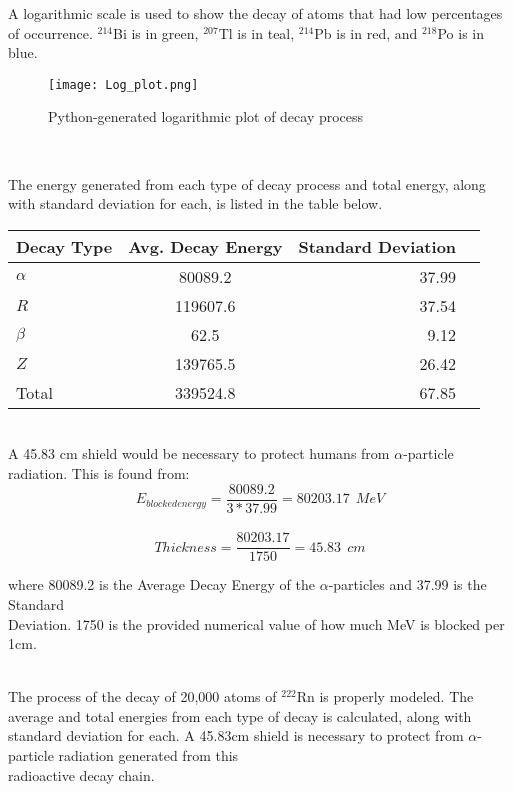 \documentclass[12pt]{article}
\begin{document}
\indent A logarithmic scale is used to show the decay of atoms that had low percentages of occurrence. \indent $^{214}$Bi is in green, $^{207}$Tl is in teal, $^{214}$Pb is in red, and $^{218}$Po is in blue.

\begin{figure}[hbt!]
    \centering
    \texttt{[image: Log\_plot.png]}
    \caption{Python-generated logarithmic plot of decay process}
    \label{fig:enter-label}
\end{figure}
\\
\clearpage 

\indent The energy generated from each type of decay process and total energy, along with standard \indent deviation for each, is listed in the table below.

\begin{center}
\begin{tabular}{|l|crr|}\hline\hline
Decay Type & Avg. Decay Energy & Standard Deviation & \\\hline\hline
$\alpha$   & 80089.2   &  37.99  &  \\
$R$   & 119607.6  &  37.54 & \\
$\beta$   & 62.5  &  9.12 &  \\
$Z$   & 139765.5   &  26.42 &  \\
Total   & 339524.8  &  67.85 &  \\\hline
\end{tabular}\vskip 0.2in
\end{center}
\\

\indent A 45.83 cm shield would be necessary to protect humans from $\alpha$-particle radiation. This is found \indent from: \ 
\begin{equation}
    E_{blocked energy} = \frac{80089.2}{3*37.99} = 80203.17 \ \ MeV
\end{equation}
\\
\begin{equation}
    Thickness = \frac{80203.17}{1750} = 45.83 \ \ cm
\end{equation}

\indent where 80089.2 is the Average Decay Energy of the $\alpha$-particles and 37.99 is the Standard \\
\indent Deviation. 1750 is the provided numerical value of how much MeV is blocked per 1cm.


\vskip0.3in
\vskip0.1in
\\

\indent The process of the decay of 20,000 atoms of $^{222}$Rn is properly modeled. The average and 
\indent total energies from each type of decay is calculated, along with standard deviation for each. 
\indent A 45.83cm shield is necessary to protect from $\alpha$-particle radiation generated from this \\
\indent radioactive decay chain. \\


\end{document}
